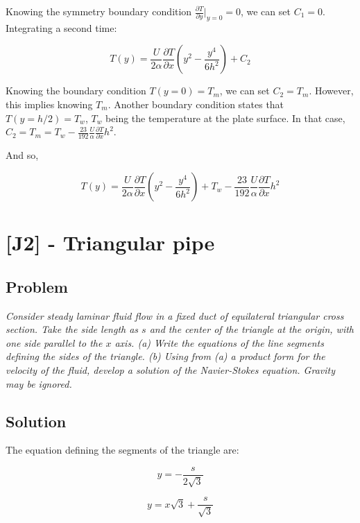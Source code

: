 Knowing the symmetry boundary condition $\frac{\partial T}{\partial y}\bigg\rvert_{y = 0} = 0$, we can set $C_1 = 0$. Integrating a second time:


\begin{equation}
T(y) = \frac{U}{2\alpha} \frac{\partial T}{\partial x} \left( y^2 - \frac{y^4}{6h^2} \right) + C_2
\end{equation}

Knowing the boundary condition $T(y = 0) = T_m$, we can set $C_2 = T_m$. However, this implies knowing $T_m$. Another boundary condition states that $T(y = h/2) = T_w$, $T_w$ being the temperature at the plate surface. In that case, $C_2 = T_m = T_w - \frac{23}{192}\frac{U}{\alpha}\frac{\partial T}{\partial x} h^2$.

And so,


\begin{equation}
T(y) = \frac{U}{2\alpha} \frac{\partial T}{\partial x} \left( y^2 - \frac{y^4}{6h^2} \right) + T_w - \frac{23}{192}\frac{U}{\alpha}\frac{\partial T}{\partial x} h^2
\end{equation}


\section{[J2] - Triangular pipe}
\label{prob94}


\subsection{Problem}
\textit{Consider steady laminar fluid flow in a fixed duct of equilateral triangular cross section. Take the side length as $s$ and the center of the triangle at the origin, with one side parallel to the $x$ axis. (a) Write the equations of the line segments defining the sides of the triangle. (b) Using from (a) a product form for the velocity of the fluid, develop a solution of the Navier-Stokes equation. Gravity may be ignored.}

\subsection{Solution}

The equation defining the segments of the triangle are:


\begin{equation}
y = -\frac{s}{2\sqrt{3}}
\end{equation}

\begin{equation}
y = x\sqrt{3} + \frac{s}{\sqrt{3}}
\end{equation}

